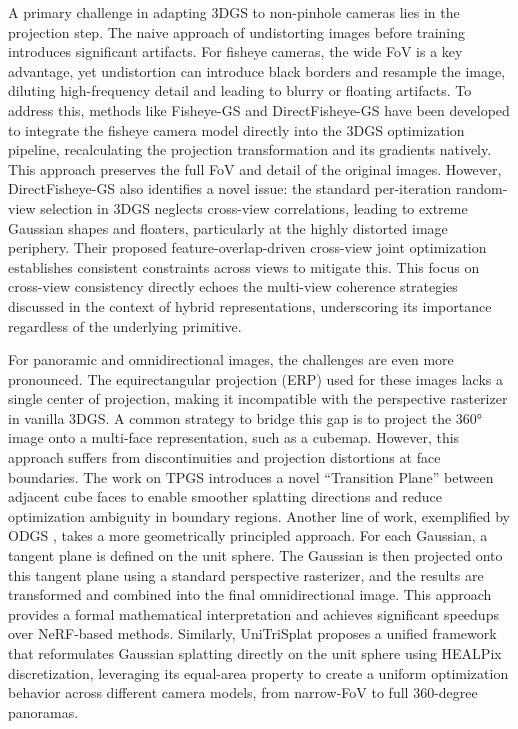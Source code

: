 \documentclass[11pt]{article}
\begin{document}
A primary challenge in adapting 3DGS to non-pinhole cameras lies in the projection step. The naive approach of undistorting images before training introduces significant artifacts. For fisheye cameras, the wide FoV is a key advantage, yet undistortion can introduce black borders and resample the image, diluting high-frequency detail and leading to blurry or floating artifacts. To address this, methods like Fisheye-GS and DirectFisheye-GS \cite{ref103,ref104} have been developed to integrate the fisheye camera model directly into the 3DGS optimization pipeline, recalculating the projection transformation and its gradients natively. This approach preserves the full FoV and detail of the original images. However, DirectFisheye-GS \cite{ref104} also identifies a novel issue: the standard per-iteration random-view selection in 3DGS neglects cross-view correlations, leading to extreme Gaussian shapes and floaters, particularly at the highly distorted image periphery. Their proposed feature-overlap-driven cross-view joint optimization establishes consistent constraints across views to mitigate this. This focus on cross-view consistency directly echoes the multi-view coherence strategies discussed in the context of hybrid representations, underscoring its importance regardless of the underlying primitive.

For panoramic and omnidirectional images, the challenges are even more pronounced. The equirectangular projection (ERP) used for these images lacks a single center of projection, making it incompatible with the perspective rasterizer in vanilla 3DGS. A common strategy to bridge this gap is to project the 360° image onto a multi-face representation, such as a cubemap. However, this approach suffers from discontinuities and projection distortions at face boundaries. The work on TPGS \cite{ref105} introduces a novel ``Transition Plane'' between adjacent cube faces to enable smoother splatting directions and reduce optimization ambiguity in boundary regions. Another line of work, exemplified by ODGS \cite{ref106}, takes a more geometrically principled approach. For each Gaussian, a tangent plane is defined on the unit sphere. The Gaussian is then projected onto this tangent plane using a standard perspective rasterizer, and the results are transformed and combined into the final omnidirectional image. This approach provides a formal mathematical interpretation and achieves significant speedups over NeRF-based methods. Similarly, UniTriSplat \cite{ref107} proposes a unified framework that reformulates Gaussian splatting directly on the unit sphere using HEALPix discretization, leveraging its equal-area property to create a uniform optimization behavior across different camera models, from narrow-FoV to full 360-degree panoramas.
\end{document}

